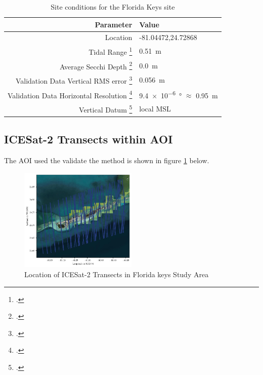 \begin{table}[h]
    \begin{minipage}{0.5\textwidth}
        \centering\begin{tabular}{r l }
            Parameter                                                      & \textbf{Value}                                 \\
            \hline
            Location                                                       & -81.04472,24.72868                             \\
            Tidal Range \footcite{Tidal_data_reanalysis2022}               & \qty{0.51}{m}                                  \\
            Average Secchi Depth \footcite{ACRI-STGlobColourTeam2020}      & \qty{0.0}{m}                                   \\
            Validation Data Vertical RMS error \footcite{Keys2019Lidar}    & \qty{0.056}{m}                                 \\
            Validation Data Horizontal Resolution \footcite{Keys2019Lidar} & \qty{9.4e-6}{ \degree} $\approx$ \qty{0.95}{m} \\
            Vertical Datum \footcite{Keys2019Lidar}                        & local MSL                                      \\
        \end{tabular}
    \end{minipage}
    \caption{Site conditions for the Florida Keys site}
    \label{table:floridasitestats}
\end{table}


\subsection{ICESat-2 Transects within AOI}
The AOI used the validate the method is shown in figure \ref{fig:keys_transects} below.
\begin{figure}[h]
    \centering
    \includegraphics[width=0.5\textwidth]{figures/florida_keys_tracklines.pdf}
    \caption{Location of ICESat-2 Transects in Florida keys Study Area}
    \label{fig:keys_transects}
\end{figure}
